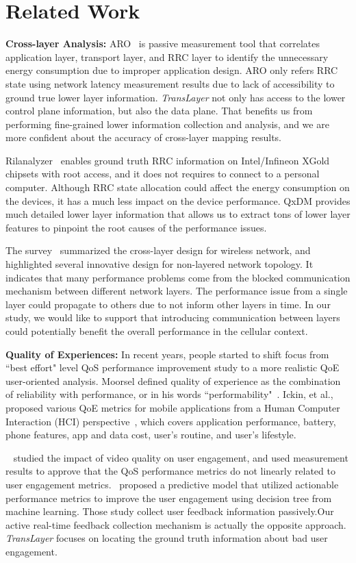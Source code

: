 \section{Related Work}
\label{sec:related}

\textbf{Cross-layer Analysis:} ARO~\cite{aro} is passive measurement tool that correlates application layer, transport layer, and RRC layer to identify the unnecessary energy consumption due to improper application design. ARO only refers RRC state using network latency measurement results due to lack of accessibility to ground true lower layer information. \textit{TransLayer} not only has access to the lower control plane information, but also the data plane. That benefits us from performing fine-grained lower information collection and analysis, and we are more confident about the accuracy of cross-layer mapping results. 

Rilanalyzer~\cite{rilanalyzer} enables ground truth RRC information on Intel/Inﬁneon XGold chipsets with root access, and it does not requires to connect to a personal computer. Although RRC state allocation could affect the energy consumption on the devices, it has a much less impact on the device performance. QxDM provides much detailed lower layer information that allows us to extract tons of lower layer features to pinpoint the root causes of the performance issues.

The survey~\cite{cross-layer.wireless} summarized the cross-layer design for wireless network, and highlighted several innovative design for non-layered network topology. It indicates that many performance problems come from the blocked communication mechanism between different network layers. The performance issue from a single layer could propagate to others due to not inform other layers in time. In our study, we would like to support that introducing communication between layers could potentially benefit the overall performance in the cellular context.

\textbf{Quality of Experiences:} In recent years, people started to shift focus from ``best effort" level QoS performance improvement study to a more realistic QoE user-oriented analysis. Moorsel defined quality of experience as the combination of reliability with performance, or in his words ``performability"~\cite{qoe.define}. Ickin, et al., proposed various QoE metrics for mobile applications from a Human Computer Interaction (HCI) perspective~\cite{qoe.application}, which covers application performance, battery, phone features, app and data cost, user's routine, and user's lifestyle.

~\cite{user.engagement.impact} studied the impact of video quality on user engagement, and used measurement results to approve that the QoS performance metrics do not linearly related to user engagement metrics.~\cite{qoe.predict} proposed a predictive model that utilized actionable performance metrics to improve the user engagement using decision tree from machine learning. Those study collect user feedback information passively.Our active real-time feedback collection mechanism is actually the opposite approach. \textit{TransLayer} focuses on locating the ground truth information about bad user engagement.